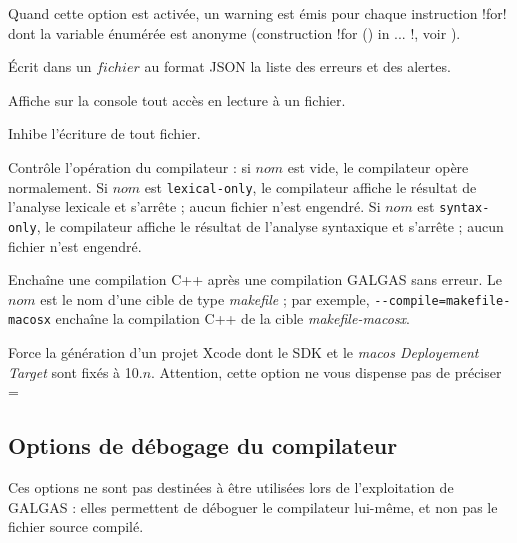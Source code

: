  Quand cette option est activée, un warning est émis pour chaque instruction \ggsq!for! dont la variable énumérée est anonyme (construction \ggsq!for () in ... !, voir ).










 Écrit dans un $fichier$ au format JSON la liste des erreurs et des alertes.


 Affiche sur la console tout accès en lecture à un fichier.


 Inhibe l'écriture de tout fichier.


 Contrôle l'opération du compilateur : si $nom$ est vide, le compilateur opère normalement. Si $nom$ est \texttt{lexical-only}, le compilateur affiche le résultat de l'analyse lexicale et s'arrête ; aucun fichier n'est engendré. Si $nom$ est \texttt{syntax-only}, le compilateur affiche le résultat de l'analyse syntaxique et s'arrête ; aucun fichier n'est engendré.





 Enchaîne une compilation C++ après une compilation GALGAS sans erreur. Le $nom$ est le nom d'une cible de type \emph{makefile} ; par exemple, \texttt{-{-}compile=makefile-macosx} enchaîne la compilation C++ de la cible \emph{makefile-macosx}.


 Force la génération d'un projet Xcode dont le SDK et le \emph{macos Deployement Target} sont fixés à 10.$n$.  Attention, cette option ne vous dispense pas de préciser \ggsq=%




\subsection{Options de débogage du compilateur}

Ces options ne sont pas destinées à être utilisées lors de l'exploitation de GALGAS : elles permettent de déboguer le compilateur lui-même, et non pas le fichier source compilé.



